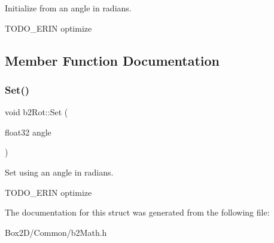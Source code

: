 Initialize from an angle in radians. 

T\+O\+D\+O\+\_\+\+E\+R\+IN optimize 

\subsection{Member Function Documentation}
\mbox{\label{structb2_rot_acde9186de0a4a7397bf8ef714408ad60}} 
\subsubsection{\texorpdfstring{Set()}{Set()}}
{\footnotesize\ttfamily void b2\+Rot\+::\+Set (\begin{DoxyParamCaption}\item[{float32}]{angle }\end{DoxyParamCaption})\hspace{0.3cm}{\ttfamily [inline]}}



Set using an angle in radians. 

T\+O\+D\+O\+\_\+\+E\+R\+IN optimize 

The documentation for this struct was generated from the following file\+:\begin{DoxyCompactItemize}
\item 
Box2\+D/\+Common/b2\+Math.\+h\end{DoxyCompactItemize}
